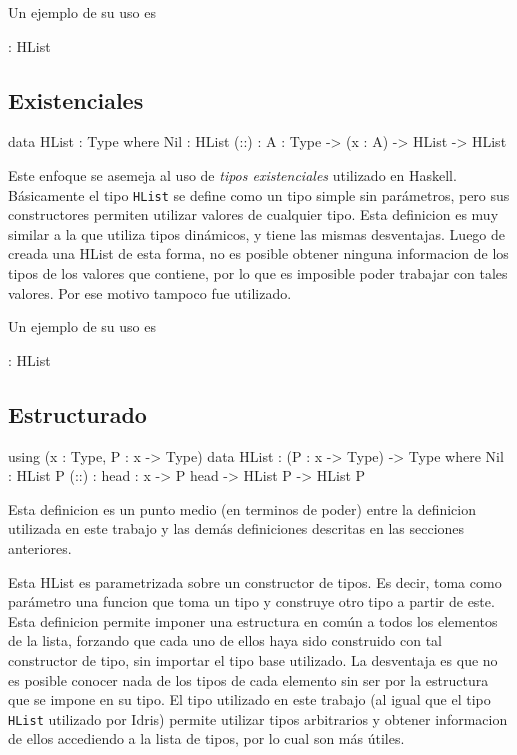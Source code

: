 Un ejemplo de su uso es 

\begin{code}
 : HList
\end{code}

\subsection{Existenciales}

\begin{code}
data HList : Type where
    Nil : HList
    (::) : {A : Type} -> (x : A) -> HList -> HList
\end{code}

Este enfoque se asemeja al uso de \textit{tipos existenciales} utilizado en Haskell. Básicamente el tipo \texttt{HList} se define como un tipo simple sin parámetros, pero sus constructores permiten utilizar valores de cualquier tipo.
Esta definicion es muy similar a la que utiliza tipos dinámicos, y tiene las mismas desventajas. Luego de creada una HList de esta forma, no es posible obtener ninguna informacion de los tipos de los valores que contiene, por lo que es imposible poder trabajar con tales valores. Por ese motivo tampoco fue utilizado.

Un ejemplo de su uso es

\begin{code}
[1,"2"] : HList
\end{code}

\subsection{Estructurado}

\begin{code}
using (x : Type, P : x -> Type)        
    data HList : (P : x -> Type) ->  Type where
        Nil : HList P
        (::) : {head : x} -> P head -> HList P -> 
          HList P 
\end{code}

Esta definicion es un punto medio (en terminos de poder) entre la definicion utilizada en este trabajo y las demás definiciones descritas en las secciones anteriores.

Esta HList es parametrizada sobre un constructor de tipos. Es decir, toma como parámetro una funcion que toma un tipo y construye otro tipo a partir de este. Esta definicion permite imponer una estructura en común a todos los elementos de la lista, forzando que cada uno de ellos haya sido construido con tal constructor de tipo, sin importar el tipo base utilizado.
La desventaja es que no es posible conocer nada de los tipos de cada elemento sin ser por la estructura que se impone en su tipo. El tipo utilizado en este trabajo (al igual que el tipo \texttt{HList} utilizado por Idris) permite utilizar tipos arbitrarios y obtener informacion de ellos accediendo a la lista de tipos, por lo cual son más útiles.

